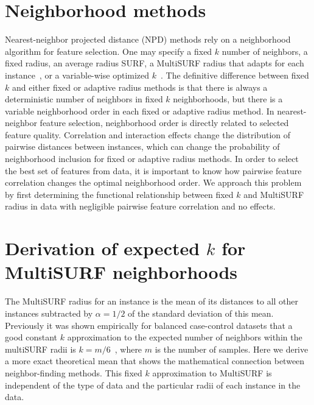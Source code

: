 \documentclass[10pt,letterpaper]{article}
\begin{document}
\section{Neighborhood methods}
Nearest-neighbor projected distance (NPD) methods rely on a neighborhood algorithm for feature selection. One may specify a fixed $k$ number of neighbors, a fixed radius, an average radius SURF, a MultiSURF radius that adapts for each instance~\cite{urbanowicz17}, or a variable-wise optimized $k$~\cite{mckinney13}. The definitive difference between fixed $k$ and either fixed or adaptive radius methods is that there is always a deterministic number of neighbors in fixed $k$ neighborhoods, but there is a variable neighborhood order in each fixed or adaptive radius method. In nearest-neighbor feature selection, neighborhood order is directly related to selected feature quality. Correlation and interaction effects change the distribution of pairwise distances between instances, which can change the probability of neighborhood inclusion for fixed or adaptive radius methods. In order to select the best set of features from data, it is important to know how pairwise feature correlation changes the optimal neighborhood order. We approach this problem by first determining the functional relationship between fixed $k$ and MultiSURF radius in data with negligible pairwise feature correlation and no effects.

\section{Derivation of expected \texorpdfstring{$k$}{} for MultiSURF neighborhoods}\label{sec:expected-k}
The MultiSURF radius for an instance is the mean of its distances to all other instances subtracted by $\alpha=1/2$ of the standard deviation of this mean. Previously it was shown empirically for balanced case-control datasets that a good constant $k$ approximation to the expected number of neighbors within the multiSURF radii is $k=m/6$~\cite{stir}, where $m$ is the number of samples. Here we derive a more exact theoretical mean that shows the mathematical connection between neighbor-finding methods. This fixed $k$ approximation to MultiSURF is independent of the type of data and the particular radii of each instance in the data.
\end{document}
